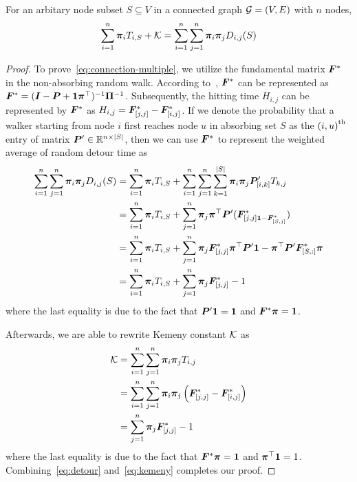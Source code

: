 \documentclass[sigconf]{acmart}
\begin{document}
\begin{theorem}\label{thm:connection-multiple}
    For an arbitary node subset \(S\subseteq V\) in a connected graph \(\mathcal{G}=(V,E)\) with \(n\) nodes,
    \begin{equation}\label{eq:connection-multiple}
        \sum_{i=1}^n\boldsymbol{\pi}_iT_{i,S}+\mathcal{K}=\sum_{i=1}^n\sum_{j=1}^n\boldsymbol{\pi}_i\boldsymbol{\pi}_jD_{i,j}(S)
    \end{equation}
\end{theorem}
\begin{proof}
    To prove~\eqref{eq:connection-multiple}, we utilize the fundamental matrix \(\boldsymbol{F}^*\) in the non-absorbing random walk.
    According to~\cite{BoRaZh11}, \(\boldsymbol{F}^*\) can be represented as \(\boldsymbol{F}^*=(\boldsymbol{I}-\boldsymbol{P}+\boldsymbol{1}\boldsymbol{\pi}^\top)^{-1}\boldsymbol{\Pi}^{-1}\).
    Subsequently, the hitting time \(H_{i,j}\) can be represented by \(\boldsymbol{F}^*\) as \(H_{i,j}=\boldsymbol{F}^*_{[j,j]}-\boldsymbol{F}^*_{[i,j]}\).
    If we denote the probability that a walker starting from node \(i\) first reaches node \(u\) in absorbing set \(S\) as the \({(i,u)}^{\rm{th}}\) entry of matrix \(\boldsymbol{P}'\in\mathbb{R}^{n\times\left|S \right|}\), then we can use \(\boldsymbol{F}^*\) to represent the weighted average of random detour time as
    \begin{equation}\label{eq:detour}
        \begin{split}
            \sum_{i=1}^n\sum_{j=1}^n\boldsymbol{\pi}_i\boldsymbol{\pi}_jD_{i,j}(S)
            & =\sum_{i=1}^n\boldsymbol{\pi}_i T_{i,S}+\sum_{i=1}^n\sum_{j=1}^n\sum_{k=1}^{\left|S \right|}\boldsymbol{\pi}_i\boldsymbol{\pi}_j\boldsymbol{P}'_{[i,k]}T_{k,j}  \\
            & =\sum_{i=1}^n\boldsymbol{\pi}_i T_{i,S}+\sum_{j=1}^n\boldsymbol{\pi}_j\boldsymbol{\pi}^\top\boldsymbol{P}'(\boldsymbol{F}^*_{[j,j]\boldsymbol{1}-\boldsymbol{F}^*_{[S,j]}})                        \\
            & =\sum_{i=1}^n\boldsymbol{\pi}_i T_{i,S}+\sum_{j=1}^n\boldsymbol{\pi}_j\boldsymbol{F}^*_{[j,j]}\boldsymbol{\pi}^\top\boldsymbol{P}'\boldsymbol{1}-\boldsymbol{\pi}^\top\boldsymbol{P}'\boldsymbol{F}^*_{[S,:]}\boldsymbol{\pi} \\
            & =\sum_{i=1}^n\boldsymbol{\pi}_i T_{i,S}+\sum_{j=1}^n\boldsymbol{\pi}_j\boldsymbol{F}^*_{[j,j]}-1
        \end{split}
    \end{equation}
    where the last equality is due to the fact that \(\boldsymbol{P}'\boldsymbol{1}=\boldsymbol{1}\) and \(\boldsymbol{F}^*\boldsymbol{\pi}=\boldsymbol{1}\).

    Afterwards, we are able to rewrite Kemeny constant \(\mathcal{K}\) as
    \begin{equation}\label{eq:kemeny}
        \begin{split}
            \mathcal{K}&=\sum_{i=1}^n\sum_{j=1}^n\boldsymbol{\pi}_i\boldsymbol{\pi}_jT_{i,j}\\
            &=\sum_{i=1}^n\sum_{j=1}^n\boldsymbol{\pi}_i\boldsymbol{\pi}_j\left( \boldsymbol{F}^*_{[j,j]}-\boldsymbol{F}^*_{[i,j]} \right)\\
            &=\sum_{j=1}^n\boldsymbol{\pi}_j\boldsymbol{F}^*_{[j,j]}-1
        \end{split}
    \end{equation}
    where the last equality is due to the fact that \(\boldsymbol{F}^*\boldsymbol{\pi}=\boldsymbol{1}\) and \(\boldsymbol{\pi}^\top\boldsymbol{1}=1\).
    Combining~\eqref{eq:detour} and~\eqref{eq:kemeny} completes our proof.
\end{proof}
\end{document}
